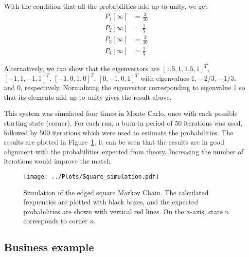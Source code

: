 \documentclass[twocolumn]{myarticle}
\begin{document}
With the condition that all the probabilities add up to unity, we get
\begin{align}
    P_1[\infty] &= \frac{3}{10}
    \\
    P_2[\infty] &= \frac{1}{5}
    \\
    P_3[\infty] &= \frac{3}{10}
    \\
    P_4[\infty] &= \frac{1}{5}
\end{align}

Alternatively, we can show that the eigenvectors are $ [1.5, 1, 1.5, 1]^T $, $ [-1, 1, -1, 1]^T $, $ [-1, 0, 1, 0]^T $, $ [0, -1, 0, 1]^T $ with eigenvalues $ 1 $, $ -2/3 $, $ -1/3 $, and $ 0 $, respectively.
Normalizing the eigenvector corresponding to eigenvalue 1 so that its elements add up to unity gives the result above.

This system was simulated four times in Monte Carlo, once with each possible starting state (corner).
For each run, a burn-in period of 50 iterations was used, followed by 500 iterations which were used to estimate the probabilities.
The results are plotted in Figure~\ref{fig:square_simulation}.
It can be seen that the results are in good alignment with the probabilities expected from theory.
Increasing the number of iterations would improve the match.

\begin{figure}[ht!]
    \begin{center}
    \texttt{[image: ../Plots/Square\_simulation.pdf]}
    \caption{%
        Simulation of the edged square Markov Chain.
        The calculated frequencies are plotted with black boxes, and the expected probabilities are shown with vertical red lines.
        On the $ x $-axis, state $ n $ corresponds to corner $ n $.
    }
    \label{fig:square_simulation}
    \end{center}
\end{figure}


\subsection{Business example}
\label{subsec:business_example}
\end{document}
